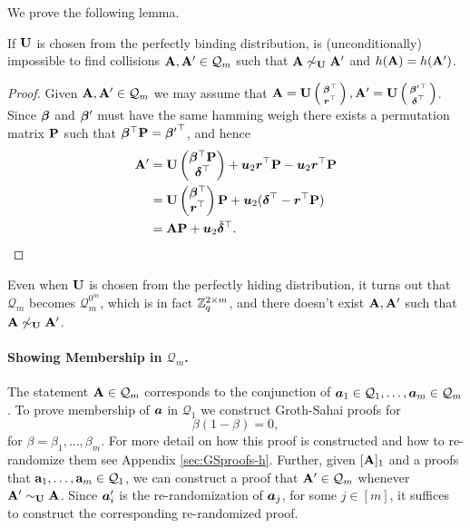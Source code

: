 We prove the following lemma.
\begin{lemma}
If $\mathbf{{U}}$ is chosen from the perfectly binding distribution, is (unconditionally) impossible to find collisions $\mathbf{{A}},\mathbf{{A}}'\in\mathcal{Q}_m$ such that $\mathbf{{A}}\not\sim_{\mathbf{{U}}}\mathbf{{A}}'$ and $h(\mathbf{{A}})=h(\mathbf{{A}}')$.
\end{lemma}
\begin{proof}
Given $\mathbf{{A}},\mathbf{{A}}'\in\mathcal{Q}_m$ we may assume that $\mathbf{{A}}=\mathbf{{U}}\left(\begin{smallmatrix}{\boldsymbol{\beta}}^\top\\{\boldsymbol{r}}^\top\end{smallmatrix}\right),\mathbf{{A}}'=\mathbf{{U}}\left(\begin{smallmatrix}{{\boldsymbol{\beta}}'}^\top\\{\boldsymbol{\delta}}^\top\end{smallmatrix}\right)$. Since ${\boldsymbol{\beta}}$ and ${\boldsymbol{\beta}}'$ must have the same hamming weigh there exists a permutation matrix $\mathbf{{P}}$ such that ${\boldsymbol{\beta}}^\top\mathbf{{P}} = {{\boldsymbol{\beta}}'}^\top$, and hence
\begin{align*}
\mathbf{{A}}' &= \mathbf{{U}}\left(\begin{matrix}{\boldsymbol{\beta}}^\top\mathbf{{P}}\\{\boldsymbol{\delta}}^\top\end{matrix}\right)+ {\boldsymbol{u}}_2{\boldsymbol{r}}^\top\mathbf{{P}} - {\boldsymbol{u}}_2{\boldsymbol{r}}^\top\mathbf{{P}}\\
&=
\mathbf{{U}} \left(\begin{matrix}{\boldsymbol{\beta}}^\top\\{\boldsymbol{r}}^\top\end{matrix}\right)\mathbf{{P}} + {\boldsymbol{u}}_2({\boldsymbol{\delta}}^\top-{\boldsymbol{r}}^\top\mathbf{{P}})\\
 &=
 \mathbf{{A}}\mathbf{{P}} + {\boldsymbol{u}}_2\tilde{{\boldsymbol{\delta}}}^\top.
\end{align*}
\end{proof}

Even 
when $\mathbf{{U}}$ is chosen from the perfectly hiding distribution, it turns out that $\mathcal{Q}_m$ becomes $\mathcal{Q}_m^{0^m}$, which is in fact $\mathbb{Z}_q^{2\times m}$, and there doesn't exist $\mathbf{{A}},\mathbf{{A}}'$ such that $\mathbf{{A}}\not\sim_{\mathbf{{U}}}\mathbf{{A}}'$. 

\paragraph{Showing Membership in $\mathcal{Q}_m$.}
The statement $\mathbf{{A}}\in\mathcal{Q}_m$ corresponds to the conjunction of ${\boldsymbol{a}}_1\in\mathcal{Q}_1,\ldots,{\boldsymbol{a}}_m\in\mathcal{Q}_m$.
To prove membership of ${\boldsymbol{a}}$ in $\mathcal{Q}_1$ we construct Groth-Sahai proofs for
\begin{equation}
\beta(1-\beta)=0 \label{eq:Qm-memb},
\end{equation}
for $\beta=\beta_1,\ldots,\beta_m$. For more detail on how this proof is constructed and how to re-randomize them see Appendix \ref{sec:GSproofs-h}.
Further, given $[\mathbf{{A}}]_1$ and a proofs that $\mathbf{{a}}_1,\ldots,\mathbf{{a}}_m\in\mathcal{Q}_1$, we can construct a proof that $\mathbf{{A}}'\in\mathcal{Q}_m$ whenever $\mathbf{{A}}'\sim_{\mathbf{{U}}}\mathbf{{A}}$. Since ${\boldsymbol{a}}'_i$ is the re-randomization of ${\boldsymbol{a}}_j$, for some $j\in[m]$, it suffices to construct the corresponding re-randomized proof.

